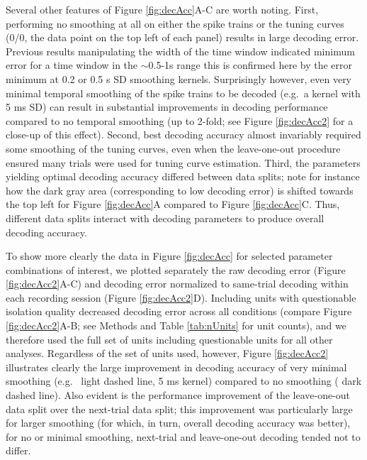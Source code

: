 \documentclass[11pt]{article}
\let\cite=\citep
\begin{document}
Several other features of Figure \ref{fig:decAcc}A-C are worth
noting. First, performing no smoothing at all on either the spike
trains or the tuning curves (0/0, the data point on the top left of
each panel) results in large decoding error. Previous results
manipulating the width of the time window indicated minimum error for
a time window in the $\sim$0.5-1s range \cite{Zhang1998} this is
confirmed here by the error minimum at 0.2 or 0.5 s SD smoothing
kernels. Surprisingly however, even very minimal temporal smoothing of
the spike trains to be decoded (e.g.\ a kernel with 5 ms SD) can
result in substantial improvements in decoding performance compared to
no temporal smoothing (up to 2-fold; see Figure \ref{fig:decAcc2} for
a close-up of this effect). Second, best decoding accuracy almost
invariably required some smoothing of the tuning curves, even when the
leave-one-out procedure ensured many trials were used for tuning curve
estimation. Third, the parameters yielding optimal decoding accuracy
differed between data splits; note for instance how the dark gray area
(corresponding to low decoding error) is shifted towards the top left
for Figure \ref{fig:decAcc}A compared to Figure
\ref{fig:decAcc}C. Thus, different data splits interact with decoding
parameters to produce overall decoding accuracy.

To show more clearly the data in Figure \ref{fig:decAcc} for selected
parameter combinations of interest, we plotted separately the raw
decoding error (Figure \ref{fig:decAcc2}A-C) and decoding error
normalized to same-trial decoding within each recording session (Figure
\ref{fig:decAcc2}D). Including units with questionable isolation
quality decreased decoding error across all conditions (compare Figure
\ref{fig:decAcc2}A-B; see Methods and Table \ref{tab:nUnits} for unit
counts), and we therefore used the full set of units including
questionable units for all other analyses. Regardless of the set of
units used, however, Figure {\color{black} \ref{fig:decAcc2}}
illustrates clearly the large improvement in decoding accuracy of very
minimal smoothing (e.g.\ {\color{black} light dashed} line, 5 ms kernel)
compared to no smoothing ({\color{black} dark dashed} line). Also
evident is the performance improvement of the leave-one-out data split
over the next-trial data split; this improvement was particularly large
for larger smoothing (for which, in turn, overall decoding accuracy
was better), for no or minimal smoothing, next-trial and leave-one-out
decoding tended not to differ.
\end{document}
